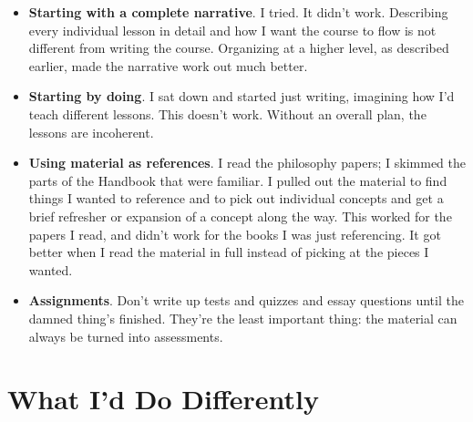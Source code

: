 \begin{itemize}
    \item \textbf{Starting with a complete narrative}.  I tried.  It didn't work.  Describing every individual lesson in detail and how I want the course to flow is not different from writing the course.  Organizing at a higher level, as described earlier, made the narrative work out much better.

    \item \textbf{Starting by doing}.  I sat down and started just writing, imagining how I'd teach different lessons.  This doesn't work.  Without an overall plan, the lessons are incoherent.

    \item \textbf{Using material as references}.  I read the philosophy papers; I skimmed the parts of the Handbook that were familiar.  I pulled out the material to find things I wanted to reference and to pick out individual concepts and get a brief refresher or expansion of a concept along the way.  This worked for the papers I read, and didn't work for the books I was just referencing.  It got better when I read the material in full instead of picking at the pieces I wanted.

    \item \textbf{Assignments}.  Don't write up tests and quizzes and essay questions until the damned thing's finished.  They're the least important thing:  the material can always be turned into assessments.
\end{itemize}

\section{What I'd Do Differently}


